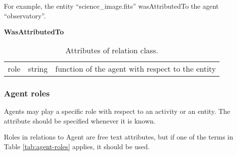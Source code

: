 For example, the entity ``science\_image.fits'' wasAttributedTo the agent ``observatory''.


\begin{table}[ht]
\small
{}\textwidth
\textbf{\normalsize WasAttributedTo}\vspace{0.25em}\\
\begin{tabulary}{1.0\textwidth}{llL}
\toprule
{} &  & \\
\midrule
role & string   & function of the agent with respect to the entity \\
\bottomrule
\end{tabulary}
\caption[Attributes of  relation class]{Attributes of  relation class.}
\label{tab:wasattributedto}
\end{table}


\subsubsection{Agent roles}

Agents may play a specific role with respect to an activity or an entity. 
The  attribute should be specified whenever it is known.

Roles in relations to Agent are free text attributes, but if one of the terms in Table \ref{tab:agent-roles} applies, it should be used.


